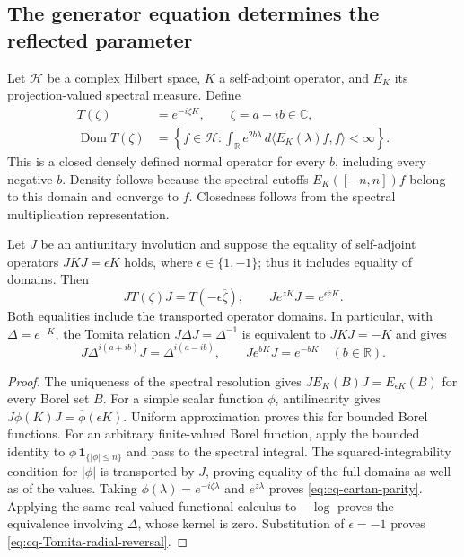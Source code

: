 \subsection{The generator equation determines the reflected parameter}

Let $\mathscr H$ be a complex Hilbert space, $K$ a self-adjoint
operator, and $E_K$ its projection-valued spectral measure. Define
\begin{equation}
\begin{split}
 T(\zeta)&=e^{-i\zeta K},\qquad \zeta=a+ib\in\mathbb C,\\
 \operatorname{Dom}T(\zeta)
 &=\left\{f\in\mathscr H:
       \int_{\mathbb R}e^{2b\lambda}\,
                   d\langle E_K(\lambda)f,f\rangle<\infty\right\}.
\end{split}
\label{eq:cq-cartan-complex-domain}
\end{equation}
This is a closed densely defined normal operator for every $b$,
including every negative $b$. Density follows because the spectral
cutoffs $E_K([-n,n])f$ belong to this domain and converge to $f$.
Closedness follows from the spectral multiplication representation.

\begin{cqproposition}
Let $J$ be an antiunitary involution and suppose the equality of
self-adjoint operators $JKJ=\epsilon K$ holds, where
$\epsilon\in\{1,-1\}$; thus it includes equality of domains.
Then
\begin{equation}
 JT(\zeta)J=T(-\epsilon\overline\zeta),\qquad
 J e^{zK}J=e^{\epsilon\overline zK}.
 \label{eq:cq-cartan-parity}
\end{equation}
Both equalities include the transported operator domains.
In particular, with $\Delta=e^{-K}$, the Tomita relation
$J\Delta J=\Delta^{-1}$ is equivalent to $JKJ=-K$ and gives
\begin{equation}
 J\Delta^{i(a+ib)}J=\Delta^{i(a-ib)},\qquad
 J e^{bK}J=e^{-bK}\quad(b\in\mathbb R).
 \label{eq:cq-Tomita-radial-reversal}
\end{equation}
\end{cqproposition}

\begin{proof}
The uniqueness of the spectral resolution gives
$JE_K(B)J=E_{\epsilon K}(B)$ for every Borel set $B$.
For a simple scalar function $\phi$, antilinearity gives
$J\phi(K)J=\overline\phi(\epsilon K)$.
Uniform approximation proves this for bounded Borel functions.
For an arbitrary finite-valued Borel function, apply the bounded
identity to $\phi\,\mathbf1_{\{|\phi|\leq n\}}$ and pass to the
spectral integral. The squared-integrability condition for
$|\phi|$ is transported by $J$, proving equality of the full
domains as well as of the values. Taking
$\phi(\lambda)=e^{-i\zeta\lambda}$ and $e^{z\lambda}$ proves
\eqref{eq:cq-cartan-parity}. Applying the same real-valued
functional calculus to $-\log$ proves the equivalence involving
$\Delta$, whose kernel is zero. Substitution of $\epsilon=-1$
proves \eqref{eq:cq-Tomita-radial-reversal}.
\end{proof}

